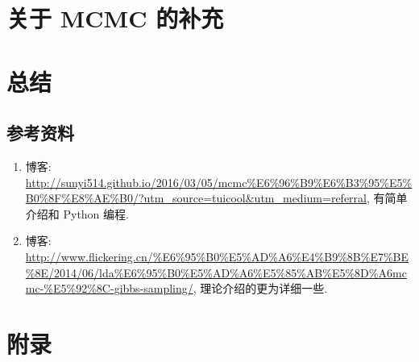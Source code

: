 \documentclass[a4paper,UTF8]{ctexart}
\theoremstyle{plain} \newtheorem{theorem}{定理}[section]
\theoremstyle{plain} \newtheorem{definition}{定义}[section]
\theoremstyle{plain} \newtheorem{lemma}{引理}[section]
\theoremstyle{plain} \newtheorem{proposition}{命题}[section]
\theoremstyle{plain} \newtheorem{example}{例}[section]
\theoremstyle{plain} \newtheorem{remark}{注}[section]
\theoremstyle{plain} \newtheorem{corollary}{推论}[section]
\begin{document}
\section{关于 MCMC 的补充}












\section{总结}
\subsection{参考资料}
\begin{enumerate}[(1)]
\item 博客: \url{http://sunyi514.github.io/2016/03/05/mcmc%E6%96%B9%E6%B3%95%E5%B0%8F%E8%AE%B0/?utm_source=tuicool&utm_medium=referral}, 有简单介绍和 Python 编程.

\item 博客: \url{http://www.flickering.cn/%E6%95%B0%E5%AD%A6%E4%B9%8B%E7%BE%8E/2014/06/lda%E6%95%B0%E5%AD%A6%E5%85%AB%E5%8D%A6mcmc-%E5%92%8C-gibbs-sampling/}, 理论介绍的更为详细一些.


\end{enumerate}




\newpage

\section*{附录}
\end{document}
